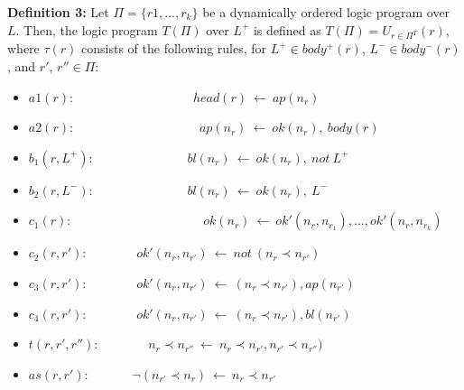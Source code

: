 \begin{frame}
  \begin{block}{\textbf{Definition 3:}}
    Let $\Pi = \{r1, ..., r_k\}$ be a dynamically ordered logic program over $L$.
    Then, the logic program $T(\Pi)$ over $L^+$ is defined as
    $T(\Pi) = U_{r \in \Pi^T}(r)$, where $\tau(r)$ consists of the following rules,
    for $L^+ \in body^+(r)$, $L^- \in body^-(r)$, and $r'$, $r'' \in \Pi$:
    \tiny
    \begin{itemize}
      \item[] $a1(r)$:~~~~~~~~~~~~~~~~~~~$head(r)~\leftarrow~ap(n_r)$
      \item[] $a2(r)$:~~~~~~~~~~~~~~~~~~~~$ap(n_r)~\leftarrow~ok(n_r),~body(r)$
      \item[] $b_1(r,L^+)$:~~~~~~~~~~~~~~~$bl(n_r)~\leftarrow~ok(n_r),~not~L^+$
      \item[] $b_2(r,L^-)$:~~~~~~~~~~~~~~~$bl(n_r)~\leftarrow~ok(n_r),~L^-$
      \item[] $c_1(r)$:~~~~~~~~~~~~~~~~~~~~~$ok(n_r)~\leftarrow~ok'(n_r, n_{r_1}), ..., ok'(n_r, n_{r_k})$
      \item[] $c_2(r, r')$:~~~~~~~~$ok'(n_r, n_{r'})~\leftarrow~not~(n_r \prec n_{r'})$
      \item[] $c_3(r, r')$:~~~~~~~~$ok'(n_r, n_{r'})~\leftarrow~(n_r \prec n_{r'}), ap(n_{r'})$
      \item[] $c_4(r, r')$:~~~~~~~~$ok'(n_r, n_{r'})~\leftarrow~(n_r \prec n_{r'}), bl(n_{r'})$
      \item[] $t(r, r', r'')$:~~~~~~~~$n_r \prec n_{r''}~\leftarrow~n_r \prec n_{r'}, n_{r'} \prec n_{r''})$
      \item[] $as(r, r')$:~~~~~~~$\neg(n_{r'} \prec n_{r})~\leftarrow~n_r \prec n_{r'}$
    \end{itemize}
  \end{block}
\end{frame}
